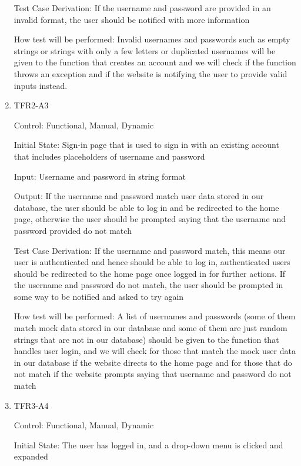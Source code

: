 \documentclass[12pt, titlepage]{article}
\begin{document}
\begin{enumerate}
  Test Case Derivation: If the username and password are provided in an invalid format, the user should be notified with more information
  
  How test will be performed: Invalid usernames and passwords such as empty strings or strings with only a few letters or duplicated usernames will be given to the function that creates an account and we will check if the function throws an exception and if the website is notifying the user to provide valid inputs instead.
  
  \item{TFR2-A3\\}
  
  Control: Functional, Manual, Dynamic
            
  Initial State: Sign-in page that is used to sign in with an existing account that includes placeholders of username and password
            
  Input: Username and password in string format
            
  Output: If the username and password match user data stored in our database, the user should be able to log in and be redirected to the home page, otherwise the user should be prompted saying that the username and password provided do not match
  
  Test Case Derivation: If the username and password match, this means our user is authenticated and hence should be able to log in, authenticated users should be redirected to the home page once logged in for further actions. If the username and password do not match, the user should be prompted in some way to be notified and asked to try again
  
  How test will be performed: A list of usernames and passwords (some of them match mock data stored in our database and some of them are just random strings that are not in our database) should be given to the function that handles user login, and we will check for those that match the mock user data in our database if the website directs to the home page and for those that do not match if the website prompts saying that username and password do not match
  
  \item{TFR3-A4\\}
  
  Control: Functional, Manual, Dynamic
            
  Initial State: The user has logged in, and a drop-down menu is clicked and expanded
            

\end{enumerate}
\end{document}
